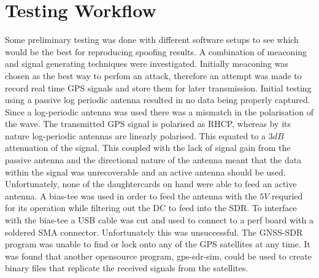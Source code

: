 \section{Testing Workflow}

Some preliminary testing was done with different software setups to see which would be the best for reproducing spoofing results. A combination of meaconing and signal
generating techniques were investigated. Initially meaconing was chosen as the best way to perfom an attack, therefore an attempt was made to record real time GPS signals
and store them for later transmission. Initial testing using a passive log periodic antenna resulted in no data being properly captured. Since a log-periodic antenna was
used there was a mismatch in the polarisation of the wave. The transmitted GPS signal is polarised as RHCP, whereas by its nature log-periodic antennas are linearly
polarised. This equated to a $3dB$ attenuation of the signal. This coupled with the lack of signal gain from the passive antenna and the directional nature of the antenna
meant that the data within the signal was unrecoverable and an active antenna should be used. Unfortunately, none of the daughtercards on hand were able to feed an active
antenna. A bias-tee was used in order to feed the antenna with the $5V$ requried for its operation while filtering out the DC to feed into the SDR. To interface with the
bias-tee a USB cable was cut and used to connect to a perf board with a soldered SMA connector. Unfortunately this was unsuccessful. The GNSS-SDR program was unable to
find or lock onto any of the GPS satellites at any time. It was found that another opensource program, gps-sdr-sim, could be used to create binary files that replicate
the received signals from the satellites. 


